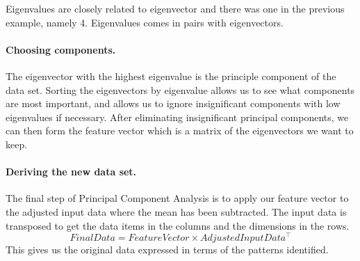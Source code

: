 Eigenvalues are closely related to eigenvector and there was one in the previous example, namely 4.
Eigenvalues comes in pairs with eigenvectors.

\paragraph{Choosing components.}
The eigenvector with the highest eigenvalue is the principle component of the data set.
Sorting the eigenvectors by eigenvalue allows us to see what components are most important, and allows us to ignore insignificant components with low eigenvalues if necessary.
After eliminating insignificant principal components, we can then form the feature vector which is a matrix of the eigenvectors we want to keep.


\paragraph{Deriving the new data set.}
The final step of Principal Component Analysis is to apply our feature vector to the adjusted input data where the mean has been subtracted.
The input data is transposed to get the data items in the columns and the dimensions in the rows.
$$FinalData = FeatureVector\times AdjustedInputData^\top $$ %
This gives us the original data expressed in terms of the patterns identified.

